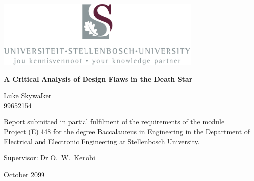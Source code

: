 \graphicspath{{frontmatter/fig/}}

\begin{titlepage}
	\begin{center}
		
		\includegraphics[width=10cm]{USlogo-top}
		
		\vfill
		
		{\sffamily \bfseries \huge A Critical Analysis of Design Flaws in the Death Star \par}
		
		\vfill
		
		{\large {\Large Luke Skywalker} \\ 99652154 \par}
		
		\vfill
		
		\vfill
		
		{Report submitted in partial fulfilment of the requirements of the module \\
			Project (E) 448 for the degree Baccalaureus in Engineering in the Department of
			Electrical and Electronic Engineering at Stellenbosch University. \par}
		
		\vfill
		
		{\large {Supervisor}: Dr O.\ W.\ Kenobi} %
		
		\vfill
		
		{\Large October 2099}
	\end{center}
\end{titlepage}
